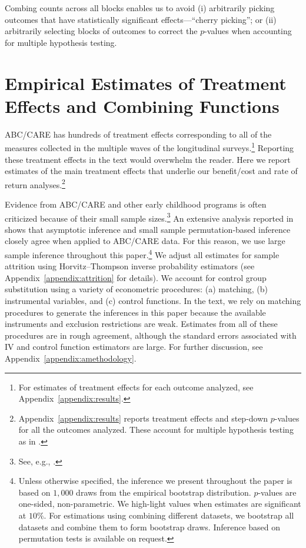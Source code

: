 Combing counts across all blocks enables us to avoid (i) arbitrarily picking outcomes that have statistically significant effects---``cherry picking''; or (ii) arbitrarily selecting blocks of outcomes to correct the $p$-values when accounting for multiple hypothesis testing.

\section{Empirical Estimates of Treatment Effects and Combining Functions}\label{section:c-functions}

ABC/CARE has hundreds of treatment effects corresponding to all of the measures collected in the multiple waves of the longitudinal surveys.\footnote{For estimates of treatment effects for each outcome analyzed, see Appendix~\ref{appendix:results}.} Reporting these treatment effects in the text would overwhelm the reader. Here we report estimates of the main treatment effects that underlie our benefit/cost and rate of return analyses.\footnote{Appendix~\ref{appendix:results} reports treatment effects and step-down $p$-values for all the outcomes analyzed. These account for multiple hypothesis testing as in \citet{Lehman_Romano_2005_AnnStat,Romano_Shaikh_2006_AnnStat}.}

Evidence from ABC/CARE and other early childhood programs is often criticized because of their small sample sizes.\footnote{See, e.g., \cite{Murray_2013_GivingKids_JJHBOOK}.} An extensive analysis reported in \citet{Campbell_Conti_etal_2014_EarlyChildhoodInvestments} shows that asymptotic inference and small sample permutation-based inference closely agree when applied to ABC/CARE data. For this reason, we use large sample inference throughout this paper.\footnote{Unless otherwise specified, the inference we present throughout the paper is based on $1,000$ draws from the empirical bootstrap distribution. $p$-values are one-sided, non-parametric. We high-light values when estimates are significant at $10\%$. For estimations using combining different datasets, we bootstrap all datasets and combine them to form bootstrap draws. Inference based on permutation tests is available on request.} We adjust all estimates for sample attrition using Horvitz--Thompson \citeyear{Horvitz_Thompson_1952_JASA} inverse probability estimators (see Appendix~\ref{appendix:attrition} for details). We account for control group substitution using a variety of econometric procedures: (a) matching, (b) instrumental variables, and (c) control functions. In the text, we rely on matching procedures to generate the inferences in this paper because the available instruments and exclusion restrictions are weak. Estimates from all of these procedures are in rough agreement, although the standard errors associated with IV and control function estimators are large. For further discussion, see Appendix~\ref{appendix:amethodology}.

